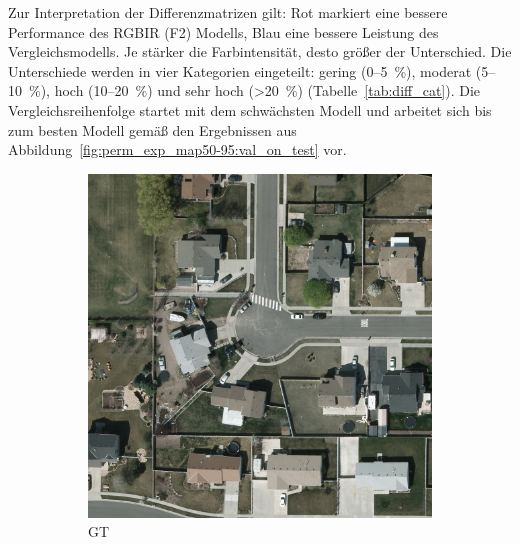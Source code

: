 Zur Interpretation der Differenzmatrizen gilt: Rot markiert eine bessere Performance des RGBIR (F2) Modells, Blau eine bessere Leistung des Vergleichsmodells. Je stärker die Farbintensität, desto größer der Unterschied. Die Unterschiede werden in vier Kategorien eingeteilt: gering (0–5~\%), moderat (5–10~\%), hoch (10–20~\%) und sehr hoch (>20~\%) (Tabelle~\ref{tab:diff_cat}). Die Vergleichsreihenfolge startet mit dem schwächsten Modell und arbeitet sich bis zum besten Modell gemäß den Ergebnissen aus Abbildung~\ref{fig:perm_exp_map50-95:val_on_test} vor.


\begin{figure}[h] 
    \centering
    \begin{subfigure}[b]{0.45\textwidth} %
        \includegraphics[width=\textwidth]{images/015Results/wrong_labels/comp_images/00000034_co.png} %
        \caption{\Acrlong{GT} } %
        \label{fig:cm_trgbir} %
    \end{subfigure}
    \hfill %
    \begin{subfigure}[b]{0.45\textwidth} %

\end{subfigure}
\end{figure}
